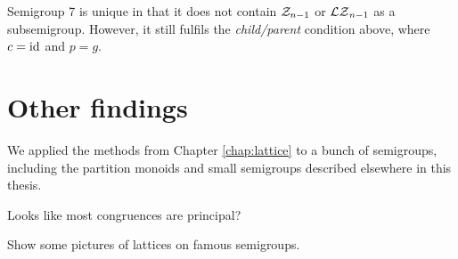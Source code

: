 Semigroup 7 is unique in that it does not contain $\mathcal{Z}_{n-1}$ or $\mathcal{LZ}_{n-1}$ as a
subsemigroup.  However, it still fulfils the \textit{child/parent} condition
above, where $c = \operatorname{id}$ and $p = g$.

\section{Other findings}
We applied the methods from Chapter \ref{chap:lattice} to a bunch of semigroups,
including the partition monoids and small semigroups described elsewhere in this
thesis.

Looks like most congruences are principal?

Show some pictures of lattices on famous semigroups.
